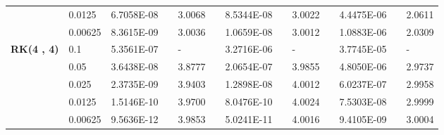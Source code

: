 \begin{table}[H]
\begin{tabular}{lllllrlrlrlrlrl}
	\multicolumn{2}{l}{} & \multicolumn{2}{l}{0.0125} & 6.7058E-08 &       & 3.0068  &       & 8.5344E-08 &       & 3.0022  &       & 4.4475E-06 &       & 2.0611  \\
	\multicolumn{2}{l}{} & \multicolumn{2}{l}{0.00625} & 8.3615E-09 &       & 3.0036  &       & 1.0659E-08 &       & 3.0012  &       & 1.0883E-06 &       & 2.0309  \\
	\multicolumn{2}{l}{\multirow{5}[1]{*}{\textbf{RK(4 , 4)}}} & \multicolumn{2}{l}{0.1} & 5.3561E-07 &       &-    &       & 3.2716E-06 &       &-    &       & 3.7745E-05 &       &-\\
	\multicolumn{2}{l}{} & \multicolumn{2}{l}{0.05} & 3.6438E-08 &       & 3.8777  &       & 2.0654E-07 &       & 3.9855  &       & 4.8050E-06 &       & 2.9737  \\
	\multicolumn{2}{l}{} & \multicolumn{2}{l}{0.025} & 2.3735E-09 &       & 3.9403  &       & 1.2898E-08 &       & 4.0012  &       & 6.0237E-07 &       & 2.9958  \\
	\multicolumn{2}{l}{} & \multicolumn{2}{l}{0.0125} & 1.5146E-10 &       & 3.9700  &       & 8.0476E-10 &       & 4.0024  &       & 7.5303E-08 &       & 2.9999  \\
	\multicolumn{2}{l}{} & \multicolumn{2}{l}{0.00625} & 9.5636E-12 &       & 3.9853  &       & 5.0241E-11 &       & 4.0016  &       & 9.4105E-09 &       & 3.0004  \\
	\bottomrule
	\end{tabular}%
	\label{tab_SAVRRK:6-3}%
	\end{table}%
	
